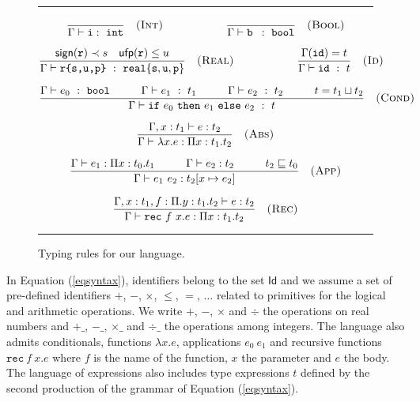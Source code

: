\begin{figure}[tb]
\hrule
\vspace{0.1cm}
$$
\frac{}
     {\Gamma \vdash \texttt{i} :\ \mathtt{int} }\quad\textsc{(Int)}
	 \hspace{2cm}
\frac{}
     {\Gamma \vdash \texttt{b } :\ \mathtt{bool} }\quad\textsc{(Bool)}
$$

$$
\frac{\mathsf{sign}(\texttt{r}) \prec s\quad \mathsf{ufp}(\texttt{r})\le u}
     {\Gamma \vdash \texttt{r\{s,u,p\}}\ :\ \mathtt{real\{s,u,p\}} }\quad\textsc{(Real)}
\hspace{2cm}
\frac{\Gamma(\mathtt{id})=t}
     {\Gamma \vdash \mathtt{id}\ :\ t }\quad\textsc{(Id)}
$$

$$
\frac{
\Gamma \vdash e_0\ :\ \mathtt{bool}\hspace{1cm}\Gamma \vdash e_1\ :\ t_1\hspace{1cm} \Gamma \vdash e_2\ :\ t_2
\hspace{1cm} t=t_1\sqcup t_2}
{\Gamma\vdash \mathtt{if}\ e_0\ \mathtt{then}\ e_1\ \mathtt{else}\ e_2\ :\  t}\quad\textsc{(Cond)}
$$

$$
\frac{\Gamma,x :t_1 \vdash e :  t_2}
     {\Gamma \vdash \lambda x.e : \Pi x:t_1 .  t_2}\quad\textsc{(Abs)}
$$

$$
\frac{\Gamma \vdash e_1 : \Pi x: t_0. t_1\hspace{1cm} \Gamma \vdash e_2 :  t_2
\hspace{1cm} t_2\sqsubseteq t_0
}
     {\Gamma \vdash e_1\ e_2 :  t_2[x\mapsto e_2]}\quad\textsc{(App)}
$$

$$
\frac{\Gamma,x :t_1,f:\Pi.y:t_1.t_2  \vdash e :  t_2}
     {\Gamma \vdash \mathtt{rec}\ f\ x.e : \Pi x:t_1 .  t_2}\quad\textsc{(Rec)}
$$
\vspace{0.1cm}
\hrule
\caption{\label{figtyp}Typing rules for our language.} 
\end{figure}


In Equation (\ref{eqsyntax}), 
identifiers belong to the set $\mathsf{Id}$ and we assume a set of pre-defined identifiers 
$+$, $-$, $\times$, $\le$, $=$, $\ldots$ related to
 primitives for the logical and arithmetic operations.
We write $+$, $-$, $\times$ and $\div$ the operations on real numbers and
  $+\_$, $-\_$, $\times\_$ and $\div\_$ the operations among integers.
The language also admits conditionals, functions $\lambda x.e$, 
applications $e_0\ e_1$ and recursive functions $\texttt{rec}\ f\ x.e$ where
$f$ is the name of the function, $x$ the parameter and $e$ the body.
The language of expressions also includes type expressions $t$ defined by the second production of the grammar 
of Equation (\ref{eqsyntax}).

